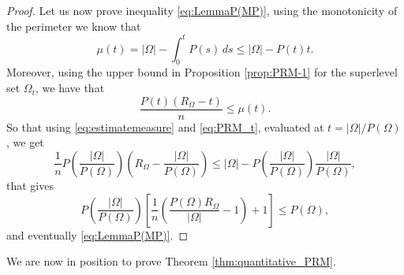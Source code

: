 \documentclass[oneside,a4paper,11pt,notitlepage]{article}
\newcommand{\abs}[1]{{\left|#1\right|}}
\theoremstyle{definition}
\theoremstyle{plain}
\theoremstyle{definition}
\begin{document}
\begin{proof}

Let us now prove inequality \eqref{eq:LemmaP(MP)}, using the monotonicity of the perimeter we know that
\begin{equation}\label{eq:estimatemeasure}
    \mu(t)=\abs{\Omega}-\int_{0}^{t}P(s)\,ds\le \abs{\Omega}-P(t)t. 
\end{equation}
Moreover, using the upper bound in Proposition \ref{prop:PRM-1} for the superlevel set $\Omega_t$, we have that
\begin{equation}\label{eq:PRM_t}
    \frac{P(t)(R_\Omega-t)}{n}\le \mu(t).
\end{equation}
So that using \eqref{eq:estimatemeasure} and \eqref{eq:PRM_t}, evaluated at $t=\abs{\Omega}/P(\Omega)$, we get
\begin{equation*}
    \frac{1}{n}P\left(\frac{\abs{\Omega}}{P(\Omega)}\right)\left(R_\Omega-\frac{\abs{\Omega}}{P(\Omega)}\right)\le \abs{\Omega}-P\left(\frac{\abs{\Omega}}{P(\Omega)}\right)\frac{\abs{\Omega}}{P(\Omega)},
\end{equation*}
that gives
\begin{equation*}
   P\left(\frac{\abs{\Omega}}{P(\Omega)}\right)\left[\frac{1}{n}\left(\frac{P(\Omega)R_\Omega}{\abs{\Omega}}-1\right)+1\right] \le P(\Omega),
\end{equation*}
and eventually \eqref{eq:LemmaP(MP)}.
\end{proof}


We are now in position to prove Theorem \ref{thm:quantitative_PRM}.
\end{document}
